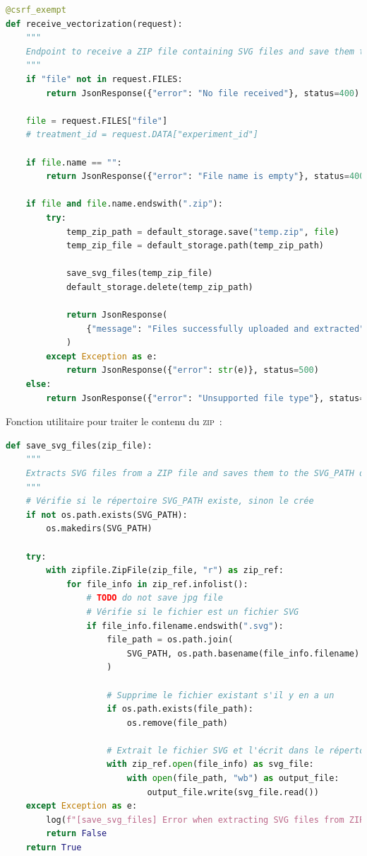 \begin{lstlisting}[language=python, frame=single, breaklines=true, caption={\emph{Endpoint} \texttt{receive\_vectorization} pour le retour des vectorisations dans l'application.}]
@csrf_exempt
def receive_vectorization(request):
    """
    Endpoint to receive a ZIP file containing SVG files and save them to the media directory.
    """
    if "file" not in request.FILES:
        return JsonResponse({"error": "No file received"}, status=400)

    file = request.FILES["file"]
    # treatment_id = request.DATA["experiment_id"]

    if file.name == "":
        return JsonResponse({"error": "File name is empty"}, status=400)

    if file and file.name.endswith(".zip"):
        try:
            temp_zip_path = default_storage.save("temp.zip", file)
            temp_zip_file = default_storage.path(temp_zip_path)

            save_svg_files(temp_zip_file)
            default_storage.delete(temp_zip_path)

            return JsonResponse(
                {"message": "Files successfully uploaded and extracted"}, status=200
            )
        except Exception as e:
            return JsonResponse({"error": str(e)}, status=500)
    else:
        return JsonResponse({"error": "Unsupported file type"}, status=400)
	\end{lstlisting}

Fonction utilitaire pour traiter le contenu du \textsc{zip}~: 

 \begin{lstlisting}[language=python, frame=single, breaklines=true, caption={Fonction utilitaire pour le traitement du contenu de l'archive.}]
 def save_svg_files(zip_file):
    """
    Extracts SVG files from a ZIP file and saves them to the SVG_PATH directory.
    """
    # Vérifie si le répertoire SVG_PATH existe, sinon le crée
    if not os.path.exists(SVG_PATH):
        os.makedirs(SVG_PATH)

    try:
        with zipfile.ZipFile(zip_file, "r") as zip_ref:
            for file_info in zip_ref.infolist():
                # TODO do not save jpg file
                # Vérifie si le fichier est un fichier SVG
                if file_info.filename.endswith(".svg"):
                    file_path = os.path.join(
                        SVG_PATH, os.path.basename(file_info.filename)
                    )

                    # Supprime le fichier existant s'il y en a un
                    if os.path.exists(file_path):
                        os.remove(file_path)

                    # Extrait le fichier SVG et l'écrit dans le répertoire spécifié
                    with zip_ref.open(file_info) as svg_file:
                        with open(file_path, "wb") as output_file:
                            output_file.write(svg_file.read())
    except Exception as e:
        log(f"[save_svg_files] Error when extracting SVG files from ZIP file", e)
        return False
    return True
	\end{lstlisting}


